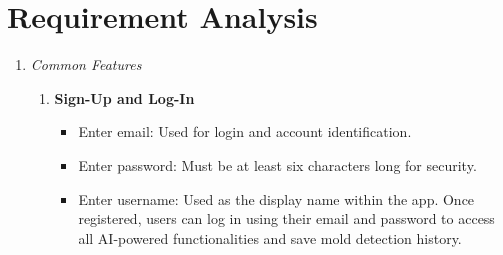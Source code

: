\documentclass[conference]{IEEEtran}
\begin{document}
\section{Requirement Analysis}
\begin{enumerate}
    \item {\it Common Features}
    \begin{enumerate}[label=(\alph*)]
        \item {\bf Sign-Up and Log-In}
            \begin{itemize}
             \item Enter email: Used for login and account identification. 
             \item Enter password: Must be at least six characters long for security.
             \item Enter username: Used as the display name within the app. Once registered, users can log in using their email and password to access all AI-powered functionalities and save mold detection history. \\
            \end{itemize}
    \end{enumerate}
     

\end{enumerate}
\end{document}
